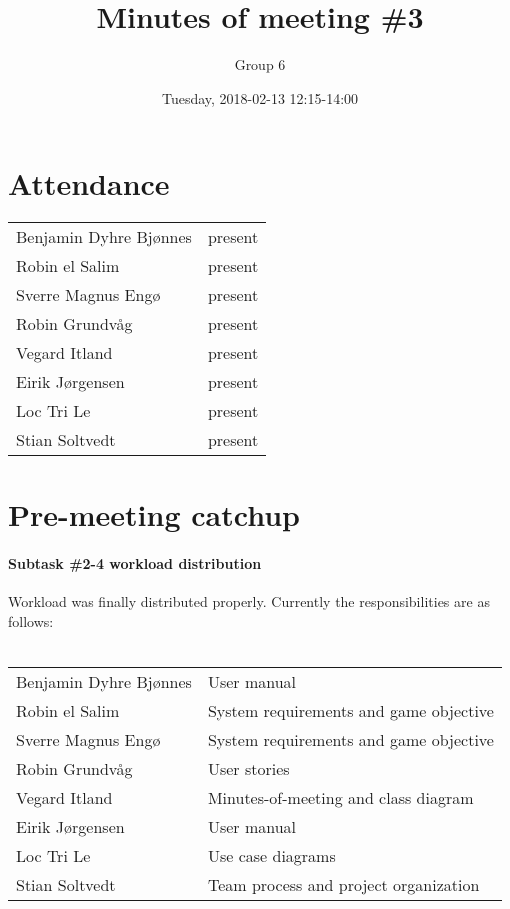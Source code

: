 \documentclass{article}
\title{Minutes of meeting \#3}
\author{Group 6}
\date{Tuesday, 2018-02-13 12:15-14:00}
\begin{document}
\maketitle

\section{Attendance}
\begin{tabular}{l l}
    Benjamin Dyhre Bjønnes     & present \\
    Robin el Salim             & present \\
    Sverre Magnus Engø         & present \\
    Robin Grundvåg             & present \\
    Vegard Itland              & present \\
    Eirik Jørgensen            & present \\
    Loc Tri Le                 & present \\
    Stian Soltvedt             & present
\end{tabular}

\section{Pre-meeting catchup}

\paragraph{Subtask \#2-4 workload distribution}

Workload was finally distributed properly. Currently the responsibilities are as follows:\\\\

\begin{tabular}{l l}
    Benjamin Dyhre Bjønnes     & User manual \\
    Robin el Salim             & System requirements and game objective \\
    Sverre Magnus Engø         & System requirements and game objective \\
    Robin Grundvåg             & User stories \\
    Vegard Itland              & Minutes-of-meeting and class diagram \\
    Eirik Jørgensen            & User manual \\
    Loc Tri Le                 & Use case diagrams \\
    Stian Soltvedt             & Team process and project organization
\end{tabular}
\end{document}

